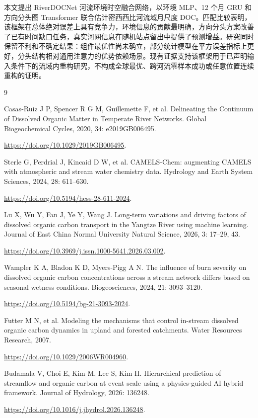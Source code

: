 \documentclass[UTF8,11pt,a4paper,fontset=none]{ctexart}
\begin{document}
本文提出 RiverDOCNet 河流环境时空融合网络，以环境 MLP、12 个月 GRU 和方向分头图 Transformer 联合估计密西西比河流域月尺度 DOC。匹配比较表明，该框架在总体绝对误差上具有竞争力，环境信息的贡献最明确，方向分头方案改善了已有时间缺口任务，真实河网信息在随机站点留出中提供了预测增益。研究同时保留不利和不确定结果：组件最优性尚未确立，部分统计模型在平方误差指标上更好，分头结构相对通用注意力的优势依赖场景。现有证据支持该框架用于已声明输入条件下的流域内重构研究，不构成全球最优、跨河流零样本成功或任意位置连续重构的证明。


\FloatBarrier

\clearpage

\begin{thebibliography}{9}

 Casas-Ruiz J P, Spencer R G M, Guillemette F, et al. Delineating the Continuum of Dissolved Organic Matter in Temperate River Networks. Global Biogeochemical Cycles, 2020, 34: e2019GB006495.
\par\nobreak\url{https://doi.org/10.1029/2019GB006495}.

 Sterle G, Perdrial J, Kincaid D W, et al. CAMELS-Chem: augmenting CAMELS with atmospheric and stream water chemistry data. Hydrology and Earth System Sciences, 2024, 28: 611--630.
\par\nobreak\url{https://doi.org/10.5194/hess-28-611-2024}.

 Lu X, Wu Y, Fan J, Ye Y, Wang J. Long-term variations and driving factors of dissolved organic carbon transport in the Yangtze River using machine learning. Journal of East China Normal University Natural Science, 2026, 3: 17--29, 43.
\par\nobreak\url{https://doi.org/10.3969/j.issn.1000-5641.2026.03.002}.

 Wampler K A, Bladon K D, Myers-Pigg A N. The influence of burn severity on dissolved organic carbon concentrations across a stream network differs based on seasonal wetness conditions. Biogeosciences, 2024, 21: 3093--3120.
\par\nobreak\url{https://doi.org/10.5194/bg-21-3093-2024}.

 Futter M N, et al. Modeling the mechanisms that control in-stream dissolved organic carbon dynamics in upland and forested catchments. Water Resources Research, 2007.
\par\nobreak\url{https://doi.org/10.1029/2006WR004960}.

 Budamala V, Choi E, Kim M, Lee S, Kim H. Hierarchical prediction of streamflow and organic carbon at event scale using a physics-guided AI hybrid framework. Journal of Hydrology, 2026: 136248.
\par\nobreak\url{https://doi.org/10.1016/j.jhydrol.2026.136248}.


\end{thebibliography}
\end{document}
